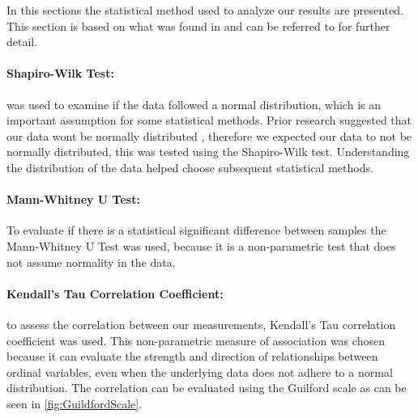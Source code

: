 In this sections the statistical method used to analyze our results are presented. This section is based on what was found in \cite{biksbois} and can be referred to for further detail. %

\paragraph{Shapiro-Wilk Test:} was used to examine if the data followed a normal distribution, which is an important assumption for some statistical methods. Prior research suggested that our data wont be normally distributed \cite{biksbois}, therefore we expected our data to not be normally distributed, this was tested using the Shapiro-Wilk test. Understanding the distribution of the data helped choose subsequent statistical methods.\cite{razali2011power}

\paragraph{Mann-Whitney U Test:}
To evaluate if there is a statistical significant difference between samples the Mann-Whitney U Test was used, because it is a non-parametric test that does not assume normality in the data.\cite{mann1947test}


\paragraph{Kendall's Tau Correlation Coefficient:}
to assess the correlation between our measurements, Kendall's Tau correlation coefficient was used. This non-parametric measure of association was chosen because it can evaluate the strength and direction of relationships between ordinal variables, even when the underlying data does not adhere to a normal distribution.\cite{han1987non} 
The correlation can be evaluated using the Guilford scale
\cite[219]{guilford1950fundamental} as can be seen in \cref{fig:GuildfordScale}.

